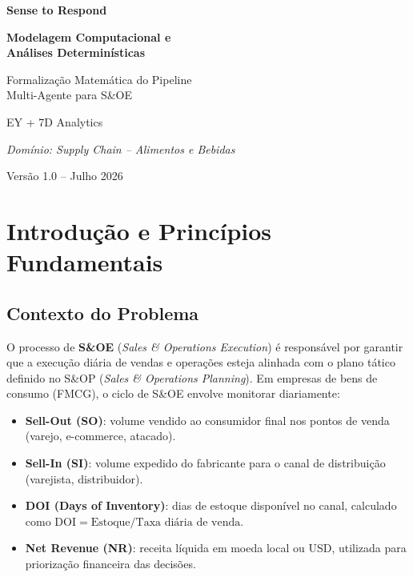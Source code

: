 \documentclass[a4paper, 12pt]{report}
\theoremstyle{definition}
\theoremstyle{remark}
\begin{document}
\begin{titlepage}
  \centering
  \vspace*{3cm}
  {\Huge\bfseries Sense to Respond\par}
  \vspace{0.5cm}
  {\Large\bfseries Modelagem Computacional e\\An\'alises Determin\'isticas\par}
  \vspace{1.5cm}
  {\large Formaliza\c{c}\~ao Matem\'atica do Pipeline\\Multi-Agente para S\&OE\par}
  \vspace{2cm}
  {\large EY + 7D Analytics\par}
  \vspace{0.5cm}
  {\large\itshape Dom\'inio: Supply Chain -- Alimentos e Bebidas\par}
  \vspace{3cm}
  {\large Vers\~ao 1.0 -- Julho 2026\par}
\end{titlepage}

\tableofcontents
\newpage


\chapter{Introdu\c{c}\~ao e Princ\'ipios Fundamentais}

\section{Contexto do Problema}

O processo de \textbf{S\&OE} (\textit{Sales \& Operations Execution})
\'e respons\'avel por garantir que a execu\c{c}\~ao di\'aria de vendas e opera\c{c}\~oes
esteja alinhada com o plano t\'atico definido no S\&OP (\textit{Sales \&
Operations Planning}). Em empresas de bens de consumo (FMCG), o ciclo
de S\&OE envolve monitorar diariamente:

\begin{itemize}
  \item \textbf{Sell-Out (SO)}: volume vendido ao consumidor final nos
    pontos de venda (varejo, e-commerce, atacado).
  \item \textbf{Sell-In (SI)}: volume expedido do fabricante para o
    canal de distribui\c{c}\~ao (varejista, distribuidor).
  \item \textbf{DOI (Days of Inventory)}: dias de estoque dispon\'ivel
    no canal, calculado como $\text{DOI} = \text{Estoque} / \text{Taxa
    di\'aria de venda}$.
  \item \textbf{Net Revenue (NR)}: receita l\'iquida em moeda local ou USD,
    utilizada para prioriza\c{c}\~ao financeira das decis\~oes.
\end{itemize}
\end{document}
